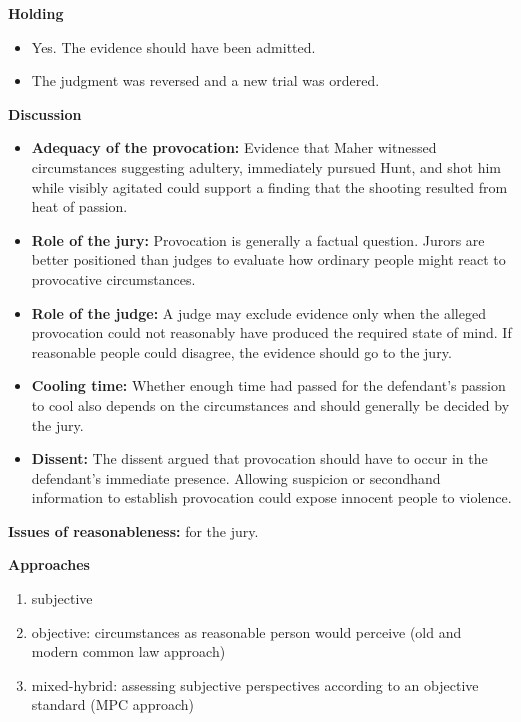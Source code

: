 \documentclass[11pt]{tex/lawoutline}
\begin{document}
{        \textbf{Holding}
        \begin{itemize}
            \item Yes. The evidence should have been admitted.
            \item The judgment was reversed and a new trial was ordered.
        \end{itemize}

        \textbf{Discussion}
        \begin{itemize}
            \item \textbf{Adequacy of the provocation:} Evidence that Maher witnessed circumstances suggesting adultery, immediately pursued Hunt, and shot him while visibly agitated could support a finding that the shooting resulted from heat of passion.
            \item \textbf{Role of the jury:} Provocation is generally a factual question. Jurors are better positioned than judges to evaluate how ordinary people might react to provocative circumstances.
            \item \textbf{Role of the judge:} A judge may exclude evidence only when the alleged provocation could not reasonably have produced the required state of mind. If reasonable people could disagree, the evidence should go to the jury.
            \item \textbf{Cooling time:} Whether enough time had passed for the defendant's passion to cool also depends on the circumstances and should generally be decided by the jury.
            \item \textbf{Dissent:} The dissent argued that provocation should have to occur in the defendant's immediate presence. Allowing suspicion or secondhand information to establish provocation could expose innocent people to violence.
        \end{itemize}
    }

\textbf{Issues of reasonableness:} for the jury.

\textbf{Approaches}
\begin{enumerate}
    \item subjective
    \item objective: circumstances as reasonable person would perceive (old and modern common law approach)
    \item mixed-hybrid: assessing subjective perspectives according to an objective standard (MPC approach)
\end{enumerate}
\end{document}
